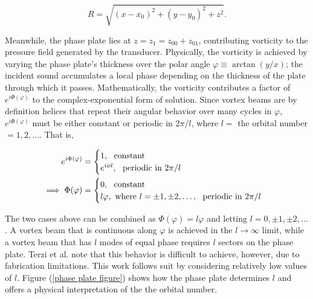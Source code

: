 \documentclass[12pt]{article}%
\begin{document}
$$R = \sqrt{(x-x_0)^2 + (y-y_0)^2 + z^2}.$$

\color{black}Meanwhile, the \color{blue}phase plate \color{black}  lies at $z = z_1 = z_{00} + z_{01}$, contributing vorticity to the pressure field generated by the transducer. Physically, the vorticity is achieved by varying the phase plate's thickness over the polar angle $\varphi \equiv \arctan (y/x)$; the incident sound accumulates a local phase depending on the thickness of the plate through which it passes. Mathematically, the vorticity contributes a factor of ${e}^{i\Phi(\varphi) }$ to the complex-exponential form of solution. Since vortex beams are by definition helices that repeat their angular behavior over many cycles in $\varphi$, $e^{i\Phi(\varphi)}$ must be either constant or periodic in $2\pi/l$, where $l=$ the orbital number $=1,2,\dots$. That is, 

\begin{align*}
    e^{i\Phi(\varphi)} &= \begin{cases}
    1, \text{ \space constant} \\    
  e^{i\phi l}, \text{ \space periodic in $2\pi/l$}
  \end{cases}\\
  \implies \Phi(\varphi) &= \begin{cases}
      0, \text{ \space constant} \\    
 l \varphi, \text{\space where } l=\pm1,\pm2,\dots, \text{ \space periodic in $2\pi/l$}
  \end{cases}
\end{align*}

\noindent The two cases above can be combined as $\Phi (\varphi) = l\varphi$ and letting $l = 0, \pm1, \pm2,\dots$. A vortex beam that is continuous along $\varphi$ is achieved in the $l\to\infty$ limit, while a vortex beam that has $l$ modes of equal phase requires $l$ sectors on the phase plate. Terzi et al. note that this behavior is difficult to achieve, however, due to fabrication limitations. This work follows suit by considering relatively low values of $l$. %
Figure (\ref{phase plate figure}) shows how the phase plate determines $l$ and offers a physical interpretation of the the orbital number.%
\end{document}
